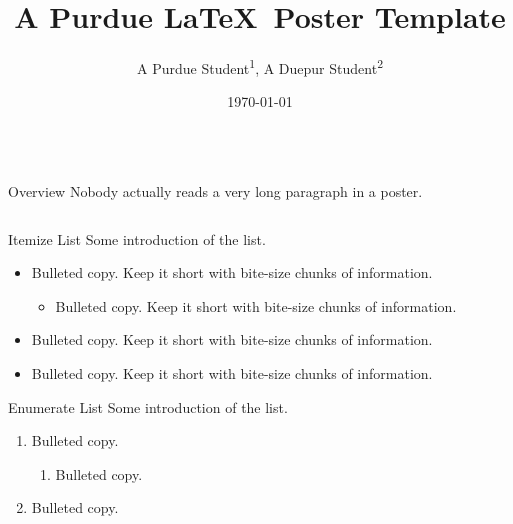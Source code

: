 \documentclass{purdue-poster}
\title{\Huge{A Purdue \LaTeX\ Poster Template}}
\author{\Large{A Purdue Student\texorpdfstring{\textsuperscript{1}}{}, A Duepur Student\texorpdfstring{\textsuperscript{2}}{}}}
\institute
{\large{Purdue University\texorpdfstring{\textsuperscript{1}}{}, Duepur University\texorpdfstring{\textsuperscript{2}},\\
Appearing at Overleaf Template}}
\date{\today}
\newlength{\postercolsep}
\newcommand{\postercolwidth}[1]{\dimeval{#1-\postercolsep}}
\begin{document}
\begin{frame}{}
\begin{columns}[onlytextwidth, t]
    \begin{column}{\postercolwidth{.6\linewidth}}

        \begin{abstractblock}{Overview}
            Nobody actually reads a very long paragraph in a poster.

            \bigskip

            \lipsum[2]
        \end{abstractblock}

        \begin{columns}[onlytextwidth, t]
        
            \begin{column}{\postercolwidth{.5\linewidth}}
                
                \begin{plainblock}{Itemize List}
                    Some introduction of the list.
                    \begin{itemize}
                        \item Bulleted copy. Keep it short with bite-size chunks of information.
                        \begin{itemize}
                            \item Bulleted copy. Keep it short with bite-size chunks of information.
                        \end{itemize}
                        \item Bulleted copy. Keep it short with bite-size chunks of information.
                        \item Bulleted copy. Keep it short with bite-size chunks of information.
                    \end{itemize}
                \end{plainblock}
            
                \begin{plainblock}{Enumerate List}
                    Some introduction of the list.
                    \begin{enumerate}
                        \item Bulleted copy.
                        \begin{enumerate}
                            \item Bulleted copy.
                        \end{enumerate}
                        \item Bulleted copy.
                    \end{enumerate}
                \end{plainblock}


\end{column}
\end{columns}
\end{column}
\end{columns}
\end{frame}
\end{document}
